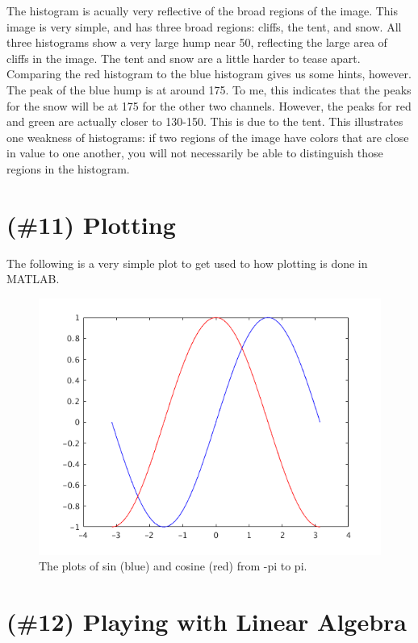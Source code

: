 \documentclass{article}
\begin{document}
The histogram is acually very reflective of the broad regions of the image. This 
image is very simple, and has three broad regions: cliffs, the tent, and snow. 
All three histograms show a very large hump near 50, reflecting the large area 
of cliffs in the image. The tent and snow are a little harder to tease apart. 
Comparing the red histogram to the blue histogram gives us some hints, however. 
The peak of the blue hump is at around 175. To me, this indicates that the peaks 
for the snow will be at 175 for the other two channels. However, the peaks for 
red and green are actually closer to 130-150. This is due to the tent. This 
illustrates one weakness of histograms: if two regions of the image have colors 
that are close in value to one another, you will not necessarily be able to 
distinguish those regions in the histogram.

\section{(\#11) Plotting}

The following is a very simple plot to get used to how plotting is done in 
MATLAB.

\begin{figure}[!ht]
	\centering
	\includegraphics[width=120mm]{figs/sin_cos.png}
	\caption{The plots of sin (blue) and cosine (red) from -pi to pi.}
\end{figure}

\section{(\#12) Playing with Linear Algebra}
\end{document}

